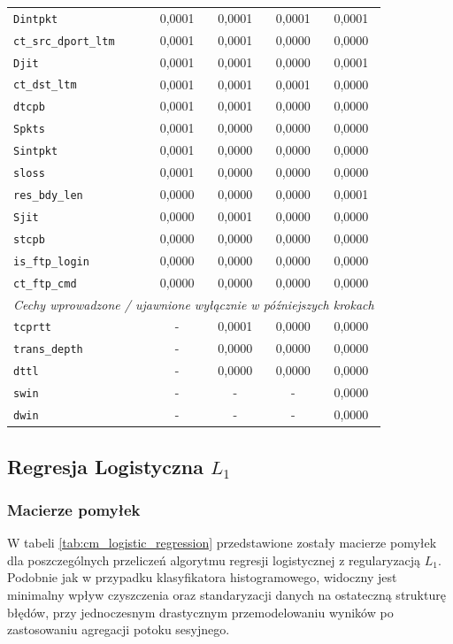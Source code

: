 \documentclass[12pt,twoside]{article}
\begin{document}
\begin{table}[htbp]
\begin{tabular}{|l|c|c|c|c|}
\texttt{Dintpkt} & 0,0001 & 0,0001 & 0,0001 & 0,0001 \\
\texttt{ct\_src\_dport\_ltm} & 0,0001 & 0,0001 & 0,0000 & 0,0000 \\
\texttt{Djit} & 0,0001 & 0,0001 & 0,0000 & 0,0001 \\
\texttt{ct\_dst\_ltm} & 0,0001 & 0,0001 & 0,0001 & 0,0000 \\
\texttt{dtcpb} & 0,0001 & 0,0001 & 0,0000 & 0,0000 \\
\texttt{Spkts} & 0,0001 & 0,0000 & 0,0000 & 0,0000 \\
\texttt{Sintpkt} & 0,0001 & 0,0000 & 0,0000 & 0,0000 \\
\texttt{sloss} & 0,0001 & 0,0000 & 0,0000 & 0,0000 \\
\texttt{res\_bdy\_len} & 0,0000 & 0,0000 & 0,0000 & 0,0001 \\
\texttt{Sjit} & 0,0000 & 0,0001 & 0,0000 & 0,0000 \\
\texttt{stcpb} & 0,0000 & 0,0000 & 0,0000 & 0,0000 \\
\texttt{is\_ftp\_login} & 0,0000 & 0,0000 & 0,0000 & 0,0000 \\
\texttt{ct\_ftp\_cmd} & 0,0000 & 0,0000 & 0,0000 & 0,0000 \\
\hline
\multicolumn{5}{|c|}{\textit{Cechy wprowadzone / ujawnione wyłącznie w późniejszych krokach}} \\
\hline
\texttt{tcprtt} & - & 0,0001 & 0,0000 & 0,0000 \\
\texttt{trans\_depth} & - & 0,0000 & 0,0000 & 0,0000 \\
\texttt{dttl} & - & 0,0000 & 0,0000 & 0,0000 \\
\texttt{swin} & - & - & - & 0,0000 \\
\texttt{dwin} & - & - & - & 0,0000 \\
\hline
\end{tabular}
\label{tab:feature_importances_comparison}
\end{table}

\subsection{Regresja Logistyczna $L_1$}

\subsubsection{Macierze pomyłek}

W tabeli \ref{tab:cm_logistic_regression} przedstawione zostały macierze pomyłek dla poszczególnych przeliczeń algorytmu regresji logistycznej z regularyzacją $L_1$. 
Podobnie jak w przypadku klasyfikatora histogramowego, widoczny jest minimalny wpływ czyszczenia oraz standaryzacji danych na ostateczną strukturę błędów, przy jednoczesnym drastycznym przemodelowaniu wyników po zastosowaniu agregacji potoku sesyjnego.
\end{document}
